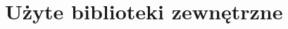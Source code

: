 \documentclass[a4paper, 11pt]{article}
\begin{document}
	
	
	
	\section{Użyte biblioteki zewnętrzne}
\end{document}
